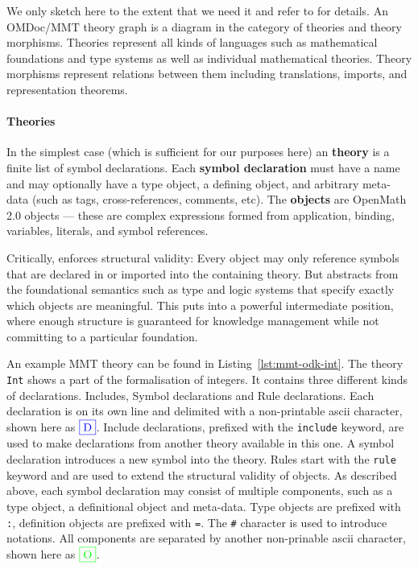 We only sketch \MMT here to the extent that we need it and refer to \cite{RabKoh:WSMSML13} for details.
An OMDoc/MMT theory graph is a diagram in the category of \MMT theories and theory morphisms.
Theories represent all kinds of languages such as mathematical foundations and type systems as well as individual mathematical theories.
Theory morphisms represent relations between them including translations, imports, and representation theorems.

\paragraph{Theories}
In the simplest case (which is sufficient for our purposes here) an \MMT \textbf{theory} is a finite list of symbol declarations.
Each \textbf{symbol declaration} must have a name and may optionally have a type object, a defining object, and arbitrary meta-data (such as tags, cross-references, comments, etc).
The \textbf{objects} are OpenMath 2.0 objects \cite{BusCapCar:2oms04} --- these are complex expressions formed from application, binding, variables, literals, and symbol references.

Critically, \MMT enforces structural validity: Every object may only reference symbols that are declared in or imported into the containing theory.
But \MMT abstracts from the foundational semantics such as type and logic systems that specify exactly which objects are meaningful.
This puts \MMT into a powerful intermediate position, where enough structure is guaranteed for knowledge management while not committing to a particular foundation.

An example MMT theory can be found in Listing~\ref{lst:mmt-odk-int}.
The theory \texttt{Int} shows a part of the formalisation of integers.
It contains three different kinds of declarations. Includes, Symbol declarations and Rule declarations.
Each declaration is on its own line and delimited with a non-printable ascii character, shown here as $\RS$.
Include declarations, prefixed with the \texttt{include} keyword, are used to make declarations from another theory available in this one.
A symbol declaration introduces a new symbol into the theory.
Rules start with the \texttt{rule} keyword and are used to extend the structural validity of objects.
As described above, each symbol declaration may consist of multiple components, such as a type object, a definitional object and meta-data.
Type objects are prefixed with \texttt{:}, definition objects are prefixed with \texttt{=}.
The \texttt{\#} character is used to introduce notations.
All components are separated by another non-prinable ascii character, shown here as $\US$.


